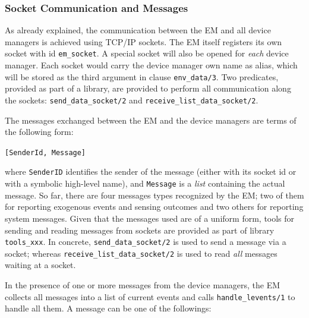 \documentclass[11pt]{article}
\begin{document}
\subsubsection{Socket Communication and Messages}

As already explained, the communication between the EM and all device managers
is achieved using TCP/IP sockets. The EM itself registers its own socket with
id \texttt{em\_socket}.
%
A special socket will also be opened for \textit{each} device manager. Each
socket would carry the device manager own name as alias, which will be stored
as the third argument in clause \texttt{env\_data/3}.
%
Two predicates, provided as part of a library, are provided to perform all
communication along the sockets: \texttt{send\_data\_socket/2} and
\texttt{receive\_list\_data\_socket/2}.

The messages exchanged between the EM and the device managers are terms of the
following form:

\centerline{\texttt{[SenderId, Message]}}

where \texttt{SenderID} identifies the sender of the message (either with its
socket id or with a symbolic high-level name), and \texttt{Message} is a
\textit{list} containing the actual message.  So far, there are four messages
types recognized by the EM; two of them for reporting exogenous events and
sensing outcomes and two others for reporting system messages. 
%
Given that the messages used are of a uniform form, tools for sending and
reading messages from sockets are provided as part of library
\texttt{tools\_xxx}. In concrete, \texttt{send\_data\_socket/2} is used to send
a message via a socket; whereas \texttt{receive\_list\_data\_socket/2} is
used to read \textit{all} messages waiting at a socket.

In the presence of one or more messages from the device managers, the EM
collects all messages into a list of current events and calls
\texttt{handle\_levents/1} to handle all them. A message can be one of the
followings:
\end{document}
